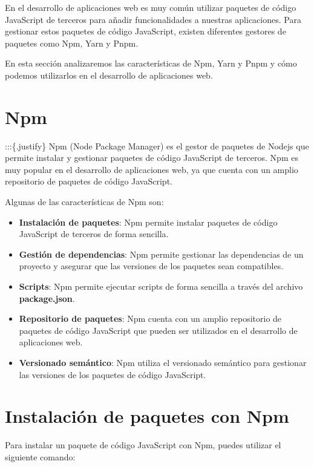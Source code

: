 \documentclass[
  a4paper,
  DIV=11,
  numbers=noendperiod,
  onepage,
  openany]{scrreprt}
\begin{document}
En el desarrollo de aplicaciones web es muy común utilizar paquetes de
código JavaScript de terceros para añadir funcionalidades a nuestras
aplicaciones. Para gestionar estos paquetes de código JavaScript,
existen diferentes gestores de paquetes como Npm, Yarn y Pnpm.

En esta sección analizaremos las características de Npm, Yarn y Pnpm y
cómo podemos utilizarlos en el desarrollo de aplicaciones web.

\section{Npm}\label{npm}

:::\{.justify\} Npm (Node Package Manager) es el gestor de paquetes de
Nodejs que permite instalar y gestionar paquetes de código JavaScript de
terceros. Npm es muy popular en el desarrollo de aplicaciones web, ya
que cuenta con un amplio repositorio de paquetes de código JavaScript.

Algunas de las características de Npm son:

\begin{itemize}
\item
  \textbf{Instalación de paquetes}: Npm permite instalar paquetes de
  código JavaScript de terceros de forma sencilla.
\item
  \textbf{Gestión de dependencias}: Npm permite gestionar las
  dependencias de un proyecto y asegurar que las versiones de los
  paquetes sean compatibles.
\item
  \textbf{Scripts}: Npm permite ejecutar scripts de forma sencilla a
  través del archivo \textbf{package.json}.
\item
  \textbf{Repositorio de paquetes}: Npm cuenta con un amplio repositorio
  de paquetes de código JavaScript que pueden ser utilizados en el
  desarrollo de aplicaciones web.
\item
  \textbf{Versionado semántico}: Npm utiliza el versionado semántico
  para gestionar las versiones de los paquetes de código JavaScript.
\end{itemize}

\section{Instalación de paquetes con
Npm}\label{instalaciuxf3n-de-paquetes-con-npm}

Para instalar un paquete de código JavaScript con Npm, puedes utilizar
el siguiente comando:
\end{document}
